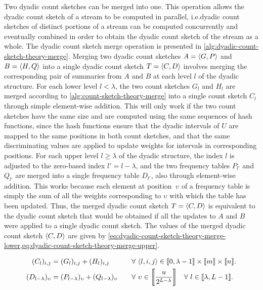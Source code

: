 Two dyadic count sketches can be merged into one.
This operation allows the dyadic count sketch of a stream to be computed in parallel, i.e.\@ dyadic count sketches of distinct portions of a stream can be computed concurrently and eventually combined in order to obtain the dyadic count sketch of the stream as a whole.
The dyadic count sketch merge operation is presented in \cref{alg:dyadic-count-sketch-theory-merge}.
Merging two dyadic count sketches \( A = \langle G, P\rangle \) and \( B = \langle H, Q\rangle \) into a single dyadic count sketch \( T = \langle C, D\rangle \) involves merging the corresponding pair of summaries from \( A \) and \( B \) at each level \( l \) of the dyadic structure.
For each lower level \( l < \lambda \), the two count sketches \( G_{l} \) and \( H_{l} \) are merged according to \cref{alg:count-sketch-theory-merge} into a single count sketch \( C_{l} \) through simple element-wise addition.
This will only work if the two count sketches have the same size and are computed using the same sequences of hash functions, since the hash functions ensure that the dyadic intervals of \( U \) are mapped to the same positions in both count sketches, and that the same discriminating values are applied to update weights for intervals in corresponding positions.
For each upper level \( l \geq \lambda \) of the dyadic structure, the index \( l \) is adjusted to the zero-based index \( l' = l - \lambda \), and the two frequency tables \( P_{l'} \) and \( Q_{l'} \) are merged into a single frequency table \( D_{l'} \), also through element-wise addition.
This works because each element at position~\( \upsilon \) of a frequency table is simply the sum of all the weights corresponding to \( \upsilon \) with which the table has been updated.
Thus, the merged dyadic count sketch \( T = \langle C, D\rangle \) is equivalent to the dyadic count sketch that would be obtained if all the updates to \( A \) and \( B \) were applied to a single dyadic count sketch.
The values of the merged dyadic count sketch \( \langle C, D\rangle \) are given by \cref{eq:dyadic-count-sketch-theory-merge-lower,eq:dyadic-count-sketch-theory-merge-upper}.

\begin{alignat}{2}
  \label{eq:dyadic-count-sketch-theory-merge-lower}
  (C_{l})_{i, j} &= (G_{l})_{i, j} + (H_{l})_{i, j} & \quad &\forall\ \datasequence{l, i, j} \in \dataintegerinterval{0, \lambda - 1} \times \dataintegerinterval{m} \times \dataintegerinterval{n}. \\
  \label{eq:dyadic-count-sketch-theory-merge-upper}
  (D_{l - \lambda})_{\upsilon} &= (P_{l - \lambda})_{\upsilon} + (Q_{l - \lambda})_{\upsilon} & \quad &\forall\ \upsilon \in \dataintegerinterval[\bigg]{\frac{u}{2^{L - \lambda}}} \quad \forall\ l \in \dataintegerinterval{\lambda, L - 1}.
\end{alignat}

